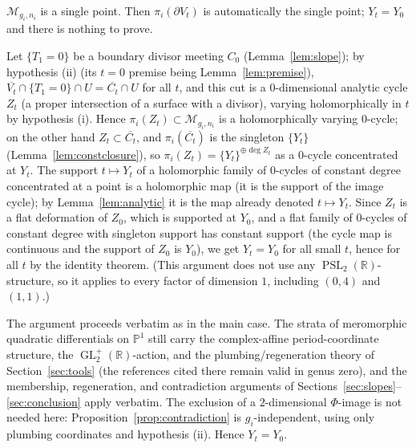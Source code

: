 \documentclass[11pt]{article}
\newcommand{\C}{\mathbb{C}}
\newcommand{\R}{\mathbb{R}}
\newcommand{\M}{\mathcal{M}}
\DeclareMathOperator{\PSL}{PSL}
\DeclareMathOperator{\GL}{GL}
\theoremstyle{definition}
\theoremstyle{remark}
\begin{document}
\begin{description}[style=nextline]
\item[Factor a point: $(g_i,n_i) = (0,3)$.]
$\M_{g_i,n_i}$ is a single point. Then $\pi_i(\partial V_t)$ is
automatically the single point; $Y_t = Y_0$ and there is nothing to
prove.

\item[One-dimensional factor: $\dim_{\C}\M_{g_i,n_i} = 1$
(i.e.\ $(g_i,n_i) = (0,4)$, or $(1,1)$ as an orbifold: $\M_{1,1}$ is
a $1$-dimensional orbifold curve, not a point).]
Let $\{T_1 = 0\}$ be a boundary divisor meeting $C_0$
(Lemma~\ref{lem:slope}); by hypothesis (ii) (its $t = 0$ premise being
Lemma~\ref{lem:premise}),
$\overline{V_t} \cap \{T_1 = 0\} \cap U = \overline{C_t} \cap U$ for
all $t$, and this cut is a $0$-dimensional analytic cycle
$Z_t$ (a proper intersection of a surface with a divisor), varying
holomorphically in $t$ by hypothesis (i). Hence
$\pi_i(Z_t) \subset \M_{g_i,n_i}$ is a holomorphically varying
$0$-cycle; on the other hand $Z_t \subset \overline{C_t}$, and
$\pi_i(\overline{C_t})$ is the singleton $\{Y_t\}$
(Lemma~\ref{lem:constclosure}), so $\pi_i(Z_t) = \{Y_t\}^{\oplus \deg
Z_t}$ as a $0$-cycle concentrated at $Y_t$. The support
$t \mapsto Y_t$ of a holomorphic family of $0$-cycles of constant
degree concentrated at a point is a holomorphic map (it is the support
of the image cycle); by Lemma~\ref{lem:analytic} it is the map already
denoted $t \mapsto Y_t$. Since $Z_t$ is a flat deformation of
$Z_0$, which is supported at $Y_0$, and a flat family of $0$-cycles
of constant degree with singleton support has constant support (the
cycle map is continuous and the support of $Z_0$ is $Y_0$), we get
$Y_t = Y_0$ for all small $t$, hence for all $t$ by the identity
theorem. (This argument does not use any
$\PSL_2(\R)$-structure, so it applies to every factor of dimension
$1$, including $(0,4)$ and $(1,1)$.)

\item[Genus zero with $n_i \ge 5$: $(g_i,n_i) = (0,n_i)$, $n_i \ge 5$.]
The argument proceeds verbatim as in the main case. The strata of
meromorphic quadratic differentials on $\mathbb P^1$ still carry the
complex-affine period-coordinate structure, the
$\GL_2^+(\R)$-action, and the plumbing/regeneration theory of
Section~\ref{sec:tools} (the references cited there remain valid in
genus zero), and the membership, regeneration, and contradiction
arguments of Sections~\ref{sec:slopes}--\ref{sec:conclusion} apply
verbatim. The exclusion of a $2$-dimensional $\Phi$-image is not
needed here: Proposition~\ref{prop:contradiction} is
$g_i$-independent, using only plumbing coordinates and
hypothesis (ii). Hence $Y_t = Y_0$.


\end{description}
\end{document}

